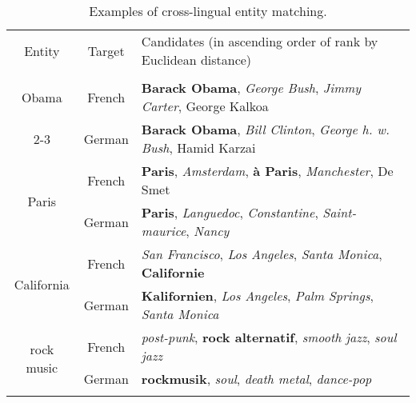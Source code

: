 \documentclass{article}
\begin{document}
\begin{table}[h]
\centering
\caption{Examples of cross-lingual entity matching.}
\label{table:case_study_entity_matching}
\vspace{-1em}		
\tiny			
\begin{tabular}{c|c|l}
\bhline
Entity       & Target   & Candidates (in ascending order of rank by Euclidean distance) \\
\bhline
\multirow{2}{*}{\pbox{10cm}{Barack\\ Obama}}
     & French   & \textbf{Barack Obama}, \emph{George Bush}, \emph{Jimmy Carter}, George Kalkoa\\
\cline{2-3}
     & German   & \textbf{Barack Obama}, \emph{Bill Clinton}, \emph{George h. w. Bush}, Hamid Karzai \\
\hline
\multirow{2}{*}{Paris}
     & French   & \textbf{Paris}, \emph{Amsterdam}, \textbf{\`a Paris}, \emph{Manchester}, De Smet\\
\cline{2-3}
     & German   & \textbf{Paris}, \emph{Languedoc}, \emph{Constantine}, \emph{Saint-maurice}, \emph{Nancy}\\
\hline
\multirow{2}{*}{California}
     & French   & \emph{San Francisco}, \emph{Los Angeles}, \emph{Santa Monica}, \textbf{Californie} \\
\cline{2-3}
     & German   & \textbf{Kalifornien}, \emph{Los Angeles}, \emph{Palm Springs}, \emph{Santa Monica}\\
\hline
\multirow{2}{*}{rock music}
     & French   & \emph{post-punk}, \textbf{rock alternatif}, \emph{smooth jazz}, \emph{soul jazz} \\
\cline{2-3}
     & German   & \textbf{rockmusik}, \emph{soul}, \emph{death metal}, \emph{dance-pop}\\
\bhline
\end{tabular}
\vspace{-1em}
\end{table}		
		
\end{document}
